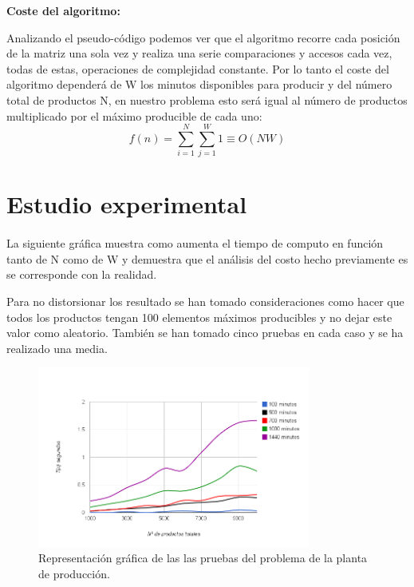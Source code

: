 \documentclass[es]{ifirak}
\begin{document}
\textbf{Coste del algoritmo:}

Analizando el pseudo-código podemos ver que el algoritmo recorre cada posición de la matriz una sola vez y realiza una serie comparaciones y accesos cada vez, todas de estas, operaciones de complejidad constante. Por lo tanto el coste del algoritmo dependerá de W los minutos disponibles para producir y del número total de productos N, en nuestro problema esto será igual al número de productos multiplicado por el máximo producible de cada uno:
$$f(n)= \sum_{i=1}^{N}\sum_{j=1}^{W} 1  \equiv O(NW)$$

\pagebreak

\section{Estudio experimental}
\paragraph{}
La siguiente gráfica muestra como aumenta el tiempo de computo en función tanto de N como de W y demuestra que el análisis del costo hecho previamente es se corresponde con la realidad.

Para no distorsionar los resultado se han tomado consideraciones como hacer que todos los productos tengan 100 elementos máximos producibles y no dejar este valor como aleatorio. También se han tomado cinco pruebas en cada caso y se ha realizado una media.
\begin{figure}[htbp]
	\centering
	\includegraphics[width=0.8\textwidth]{grafica.png}
	\caption{Representación gráfica de las las pruebas del problema de la planta de producción.}\label{figure}
\end{figure}
\end{document}
